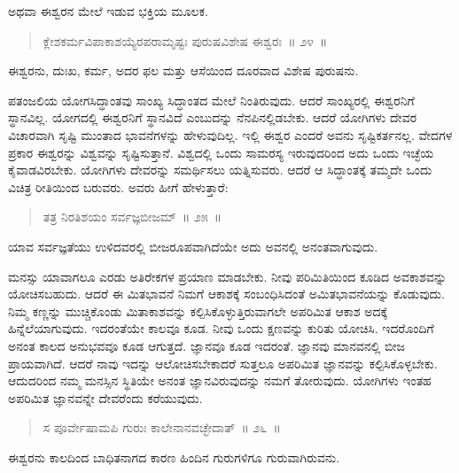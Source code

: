 \vspace{-0.3cm}

ಅಥವಾ ಈಶ್ವರನ ಮೇಲೆ ಇಡುವ ಭಕ್ತಿಯ ಮೂಲಕ. 

\vspace{-0.3cm}

\begin{verse}
ಕ್ಲೇಶಕರ್ಮವಿಪಾಕಾಶಯ್ಯೆರಪರಾಮೃಷ್ಟಃ ಪುರುಷವಿಶೇಷ ಈಶ್ವರಃ~॥ ೨೪~॥
\end{verse}

\vspace{-0.3cm}

ಈಶ್ವರನು, ದುಃಖ, ಕರ್ಮ, ಅದರ ಫಲ ಮತ್ತು ಆಸೆಯಿಂದ ದೂರವಾದ ವಿಶೇಷ ಪುರುಷನು. 

ಪತಂಜಲಿಯ ಯೋಗಸಿದ್ಧಾಂತವು ಸಾಂಖ್ಯ ಸಿದ್ಧಾಂತದ ಮೇಲೆ ನಿಂತಿರುವುದು. ಆದರೆ ಸಾಂಖ್ಯರಲ್ಲಿ ಈಶ್ವರನಿಗೆ ಸ್ಥಾನವಿಲ್ಲ. ಯೋಗದಲ್ಲಿ ಈಶ್ವರನಿಗೆ ಸ್ಥಾನವಿದೆ ಎಂಬುದನ್ನು ನೆನಪಿನಲ್ಲಿಡಬೇಕು. ಆದರೆ ಯೋಗಿಗಳು ದೇವರ ವಿಚಾರವಾಗಿ ಸೃಷ್ಟಿ ಮುಂತಾದ ಭಾವನೆ\break ಗಳನ್ನು ಹೇಳುವುದಿಲ್ಲ. ಇಲ್ಲಿ ಈಶ್ವರ ಎಂದರೆ ಅವನು ಸೃಷ್ಟಿಕರ್ತನಲ್ಲ. ವೇದಗಳ ಪ್ರಕಾರ ಈಶ್ವರನ್ನು ವಿಶ್ವವನ್ನು ಸೃಷ್ಟಿಸುತ್ತಾನೆ. ವಿಶ್ವದಲ್ಲಿ ಒಂದು ಸಾಮರಸ್ಯ ಇರುವುದರಿಂದ ಅದು ಒಂದು ಇಚ್ಛೆಯ ಕೈವಾಡವಿರಬೇಕು. ಯೋಗಿಗಳು ದೇವರನ್ನು ಸಮರ್ಥಿಸಲು ಯತ್ನಿಸುವರು. ಆದರೆ ಆ ಸಿದ್ಧಾಂತಕ್ಕೆ ತಮ್ಮದೇ ಒಂದು ವಿಚಿತ್ರ ರೀತಿಯಿಂದ ಬರುವರು. ಅವರು ಹೀಗೆ ಹೇಳುತ್ತಾರೆ:

\vspace{-0.3cm}

\begin{verse}
ತತ್ರ ನಿರತಿಶಯಂ ಸರ್ವಜ್ಞಬೀಜಮ್​~॥ ೨೫~॥
\end{verse}

\vspace{-0.3cm}

ಯಾವ ಸರ್ವಜ್ಞತೆಯು ಉಳಿದವರಲ್ಲಿ ಬೀಜರೂಪವಾಗಿದೆಯೇ ಅದು ಅವನಲ್ಲಿ ಅನಂತವಾಗುವುದು. 

ಮನಸ್ಸು ಯಾವಾಗಲೂ ಎರಡು ಅತಿರೇಕಗಳ ಪ್ರಯಾಣ ಮಾಡಬೇಕು. ನೀವು ಪರಿಮಿತಿಯಿಂದ ಕೂಡಿದ ಅವಕಾಶವನ್ನು ಯೋಚಿಸಬಹುದು. ಆದರೆ ಈ ಮಿತಭಾವನೆ ನಿಮಗೆ ಆಕಾಶಕ್ಕೆ ಸಂಬಂಧಿಸಿದಂತೆ ಅಮಿತಭಾವನೆಯನ್ನು ಕೊಡುವುದು. ನಿಮ್ಮ ಕಣ್ಣನ್ನು ಮುಚ್ಚಿಕೊಂಡು ಮಿತಾಕಾಶವನ್ನು ಕಲ್ಪಿಸಿಕೊಳ್ಳುತ್ತಿರುವಾಗಲೇ ಅಪರಿಮಿತ ಆಕಾಶ ಅದಕ್ಕೆ ಹಿನ್ನೆಲೆಯಾಗುವುದು. ಇದರಂತೆಯೇ ಕಾಲವೂ ಕೂಡ. ನೀವು ಒಂದು ಕ್ಷಣವನ್ನು ಕುರಿತು ಯೋಚಿಸಿ. ಇದರೊಂದಿಗೆ ಅನಂತ ಕಾಲದ ಅನುಭವವೂ ಕೂಡ ಆಗುತ್ತದೆ. ಜ್ಞಾನವೂ ಕೂಡ ಇದರಂತೆ. ಜ್ಞಾನವು ಮಾನವನಲ್ಲಿ ಬೀಜ ಪ್ರಾಯವಾಗಿದೆ. ಆದರೆ ನಾವು ಇದನ್ನು ಆಲೋಚಿಸಬೇಕಾದರೆ ಸುತ್ತಲೂ ಅಪರಿಮಿತ ಜ್ಞಾನವನ್ನು ಕಲ್ಪಿಸಿಕೊಳ್ಳಬೇಕು. ಆದುದರಿಂದ ನಮ್ಮ ಮನಸ್ಸಿನ ಸ್ಥಿತಿಯೇ ಅನಂತ ಜ್ಞಾನವಿರುವುದನ್ನು ನಮಗೆ ತೋರುವುದು. ಯೋಗಿಗಳು ಇಂತಹ ಅಪರಿಮಿತ ಜ್ಞಾನವನ್ನೇ ದೇವರೆಂದು ಕರೆಯುವುದು.

\begin{verse}
ಸ ಪೂರ್ವೇಷಾಮಪಿ ಗುರುಃ ಕಾಲೇನಾನವಚ್ಛೇದಾತ್​~॥ ೨೬~॥
\end{verse}

ಈಶ್ವರನು ಕಾಲದಿಂದ ಬಾಧಿತನಾಗದ ಕಾರಣ ಹಿಂದಿನ ಗುರುಗಳಿಗೂ ಗುರುವಾಗಿರು\break ವನು. 


